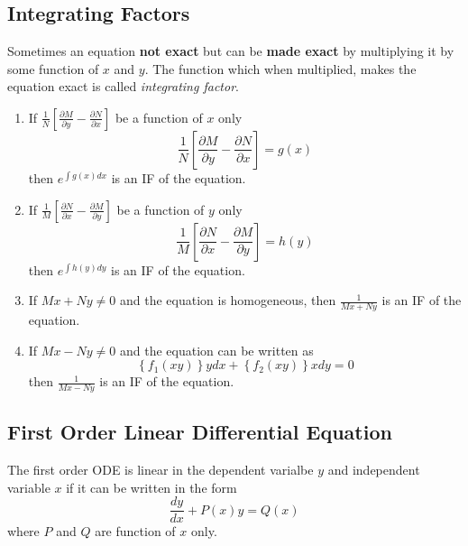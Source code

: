 \documentclass[oneside]{book}
\begin{document}
\subsection{Integrating Factors}
\label{integrating_factor_subsection}
Sometimes an equation \textbf{not exact} but can be \textbf{made exact} by multiplying it by some function of $x$ and $y$. The function which when multiplied, makes the equation exact is called \textit{integrating factor}.
\renewcommand{\labelenumi}{\textbf{\arabic{enumi}:}}
\begin{enumerate}
	\item If
	      \(
	      \displaystyle\frac{1}{N}\left[\frac{\partial M}{\partial y} - \frac{\partial N}{\partial x}\right]
	      \)
	      be a function of $x$ only
	      \[
		      \frac{1}{N}\left[\frac{\partial M}{\partial y} - \frac{\partial N}{\partial x}\right] = g(x)
	      \]
	      then \(\displaystyle e^{\int g(x) dx}\) is an IF of the equation.
	      \label{rule_1_for_integrating_factor}
	\item If
	      \(
	      \displaystyle\frac{1}{M}\left[\frac{\partial N}{\partial x} - \frac{\partial M}{\partial y}\right]
	      \)
	      be a function of $y$ only
	      \[
		      \frac{1}{M}\left[\frac{\partial N}{\partial x} - \frac{\partial M}{\partial y}\right] = h(y)
	      \]
	      then \(\displaystyle e^{\int h(y) dy}\) is an IF of the equation.
	\item If
	      \(
	      \displaystyle Mx + Ny \neq 0
	      \)
	      and the equation is homogeneous,
	      then \(\displaystyle \frac{1}{Mx + Ny}\) is an IF of the equation.
	\item If
	      \(
	      \displaystyle Mx - Ny \neq 0
	      \)
	      and the equation can be written as
	      \[
		      \left\{f_1(xy)\right\}ydx + \left\{f_2(xy)\right\}xdy = 0
	      \]
	      then \(\displaystyle \frac{1}{Mx - Ny}\) is an IF of the equation.
\end{enumerate}

\subsection{First Order Linear Differential Equation}
The first order ODE is linear in the dependent varialbe $y$ and independent variable $x$ if it can be written in the form
\begin{equation}
	\frac{dy}{dx} + P(x)y = Q(x)
	\label{first_order_linear_de_general}
\end{equation}
where $P$ and $Q$ are function of $x$ only.
\end{document}
